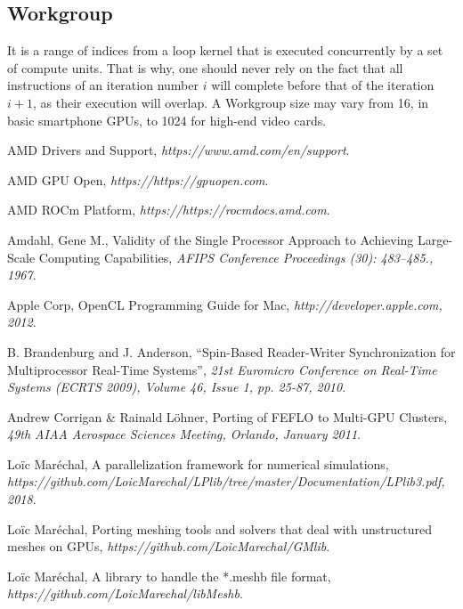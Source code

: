 \documentclass[a4paper,12pt]{article}
\begin{document}
\subsection{Workgroup}
It is a range of indices from a loop kernel that is executed concurrently by a set of compute units. That is why, one should never rely on the fact that all instructions of an iteration number $i$ will complete before that of the iteration $i+1$, as their execution will overlap. A Workgroup size may vary from 16, in basic smartphone GPUs, to 1024 for high-end video cards.


%
%

\clearpage
{}

\begin{thebibliography}{99}
\small

	AMD Drivers and Support,
	\emph{https://www.amd.com/en/support}.

	AMD GPU Open,
	\emph{https://https://gpuopen.com}.

	AMD ROCm Platform,
	\emph{https://https://rocmdocs.amd.com}.

	Amdahl, Gene M.,
	Validity of the Single Processor Approach to Achieving Large-Scale Computing Capabilities,
	\emph{AFIPS Conference Proceedings (30): 483–485., 1967}.

	Apple Corp,
	OpenCL Programming Guide for Mac,
	\emph{http://developer.apple.com, 2012}.

        B. Brandenburg and J. Anderson,
        “Spin-Based Reader-Writer Synchronization for Multiprocessor Real-Time Systems”,
        \emph{21st Euromicro Conference on Real-Time Systems (ECRTS 2009), Volume 46, Issue 1, pp. 25-87, 2010}.

	Andrew Corrigan \& Rainald Löhner,
	Porting of FEFLO to Multi-GPU Clusters,
	\emph{49th AIAA Aerospace Sciences Meeting, Orlando, January 2011}.

	Loïc Maréchal,
	A parallelization framework for numerical simulations,
	\emph{https://github.com/LoicMarechal/LPlib/tree/master/Documentation/LPlib3.pdf, 2018}.

	Loïc Maréchal,
	Porting meshing tools and solvers that deal with unstructured meshes on GPUs,
	\emph{https://github.com/LoicMarechal/GMlib}.

	Loïc Maréchal,
	A library to handle the *.meshb file format,
	\emph{https://github.com/LoicMarechal/libMeshb}.


\end{thebibliography}
\end{document}
